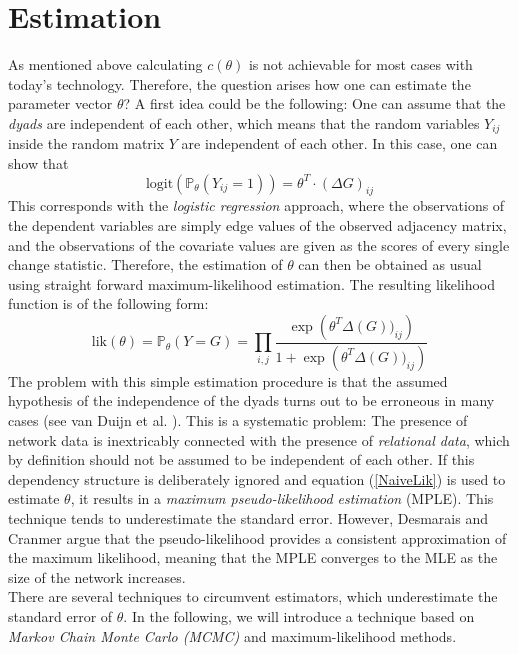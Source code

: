 \documentclass[10pt, conference, compsocconf]{IEEEtran}
\begin{document}
\section{Estimation}
\noindent As mentioned above calculating $c(\theta)$ is not achievable for most cases with today's technology. Therefore, the question arises how one can estimate the parameter vector $\theta$?
A first idea could be the following: One can assume that the \textit{dyads} are independent of each other, which means that the random variables $Y_{ij}$ inside the random matrix $Y$ are independent of each other. 
In this case, one can show that
%
\begin{equation*}
\text{logit}(\mathbb{P}_{\theta}(Y_{ij}=1))= \theta^T \cdot (\Delta G)_{ij}
\end{equation*}
This corresponds with the \textit{logistic regression} approach, where the observations of the dependent variables are simply edge values of the observed adjacency matrix, and the observations of the covariate values are given as the scores of every single change statistic. Therefore, the estimation of $\theta$ can then be obtained as usual using straight forward maximum-likelihood estimation. The resulting likelihood function is of the following form:
\begin{equation}
\text{lik}(\theta)= \mathbb{P}_{\theta}(Y=G)= \prod_{i,j} \dfrac{ \exp \left(\theta^T \Delta(G))_{ij} \right)}{1+\exp \left(\theta^T \Delta(G))_{ij} \right)}
\label{NaiveLik}
\end{equation}
The problem with this simple estimation procedure is that the assumed hypothesis of the independence of the dyads turns out to be erroneous in many cases (see van Duijn et al. \cite{vanDuijnetal2009}). This is a systematic problem: The presence of network data is inextricably connected with the presence of \textit{relational data}, which by definition should not be assumed to be independent of each other. If this dependency structure is deliberately ignored and equation (\ref{NaiveLik}) is used to estimate $\theta$, it results in a \textit{maximum pseudo-likelihood estimation} (MPLE). This technique tends to underestimate the standard error. However, Desmarais and Cranmer \cite{Desmarais.2012} argue that the pseudo-likelihood provides a consistent approximation of the maximum likelihood, meaning that the MPLE converges to the MLE as the size of the network increases.\\[0.3cm]
There are several techniques to circumvent estimators, which underestimate the standard error of $\theta$. In the following, we will introduce a technique based on \textit{Markov Chain Monte Carlo (MCMC)} and maximum-likelihood methods.\\[0.3cm]
\end{document}
